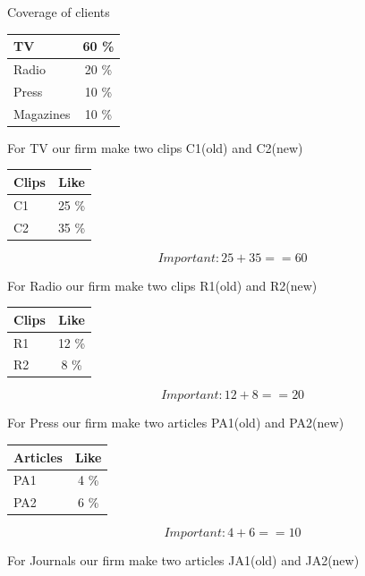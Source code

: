 \documentclass[a4paper,11pt]{scrartcl}
\begin{document}
Coverage  of clients

\begin{tabular}{|l |c|}
\hline
 TV &  60 \% \\
\hline
Radio  & 20 \% \\
\hline
Press  & 10 \% \\
\hline
Magazines  & 10 \% \\
\hline

\end{tabular}

For TV our firm make two clips C1(old) and C2(new)

\begin{tabular}{|l |c|}
\hline
Clips  & Like  \\

\hline
C1  & 25  \%\\
\hline
C2  & 35  \%\\
\hline

\end {tabular}
\begin{equation} Important:   25+35 == 60 \end{equation}

For Radio our firm make two clips R1(old) and R2(new)

\begin{tabular}{|l |c|}
\hline
Clips  & Like  \\

\hline
R1  & 12  \%\\
\hline
R2  & 8  \%\\
\hline

\end {tabular}
\begin{equation} Important:  12+8 == 20 \end{equation}

For Press our firm make two articles PA1(old) and PA2(new)

\begin{tabular}{|l |c|}
\hline
 Articles & Like  \\

\hline
PA1  & 4  \%\\
\hline
PA2  & 6  \%\\
\hline

\end {tabular}
\begin{equation} Important:  4+6 == 10 \end{equation}

For Journals our firm make two articles JA1(old) and JA2(new)
\end{document}
